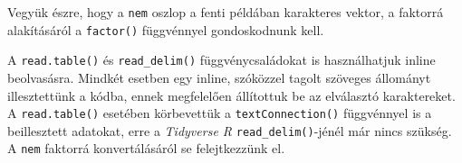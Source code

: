 \documentclass[
]{book}
\newenvironment{Shaded}{\begin{snugshade}}{\end{snugshade}}
\newcommand{\AttributeTok}[1]{\textcolor[rgb]{0.77,0.63,0.00}{#1}}
\newcommand{\CommentTok}[1]{\textcolor[rgb]{0.56,0.35,0.01}{\textit{#1}}}
\newcommand{\FunctionTok}[1]{\textcolor[rgb]{0.00,0.00,0.00}{#1}}
\newcommand{\NormalTok}[1]{#1}
\newcommand{\OtherTok}[1]{\textcolor[rgb]{0.56,0.35,0.01}{#1}}
\newcommand{\SpecialCharTok}[1]{\textcolor[rgb]{0.00,0.00,0.00}{#1}}
\newcommand{\StringTok}[1]{\textcolor[rgb]{0.31,0.60,0.02}{#1}}
\begin{document}
Vegyük észre, hogy a \texttt{nem} oszlop a fenti példában karakteres vektor, a faktorrá alakításáról a \texttt{factor()} függvénnyel gondoskodnunk kell.

\begin{Shaded}
\end{Shaded}

A \texttt{read.table()} és \texttt{read\_delim()} függvénycsaládokat is használhatjuk inline beolvasásra. Mindkét esetben egy inline, szóközzel tagolt szöveges állományt illesztettünk a kódba, ennek megfelelően állítottuk be az elválasztó karaktereket. A \texttt{read.table()} esetében körbevettük a \texttt{textConnection()} függvénnyel is a beillesztett adatokat, erre a \emph{Tidyverse R} \texttt{read\_delim()}-jénél már nincs szükség. A \texttt{nem} faktorrá konvertálásáról se felejtkezzünk el.
\end{document}
